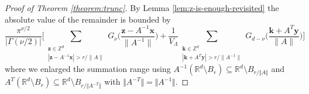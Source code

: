 \documentclass[10pt,a4paper]{amsart}
\begin{document}
\begin{proof}[Proof of Theorem \ref{theorem:trunc}]
By 
Lemma \ref{lem:z-is-enough-revisited} the absolute value of the remainder is bounded by
$$
    \frac{\pi^{\nu/2}}{|\Gamma(\nu/2)|}\Bigg[\sum_{\substack{\bm z\in\mathds Z^d\\ |\bm z - A^{-1}\bm x|> r/\|A\|}}\!\!
    G_{\nu}\Big(\frac{\bm{z} -A^{-1}\bm x}{\|A^{-1}\|}\Big)
+\frac{1}{V_{\Lambda}}
\!\!\!
\sum_{\substack{\bm k\in\mathds Z^d\\ |\bm k + A^T\bm y|> r/\|A^{-1}\|}}
\!\!\!\!\!
G_{d-\nu}
\Big(\frac{\bm{k} + A^T\bm y}{\|A\|}\Big) 
\Bigg]
$$
where we enlarged the summation range using $A^{-1}(\mathds R^d\setminus B_r)\subseteq \mathds R^d\setminus B_{r/\Vert A\Vert}$ and
$A^{T}(\mathds R^d\setminus B_r)\subseteq \mathds R^d\setminus B_{r/\Vert A^{-T}\Vert}$ with $\Vert A^{-T}\Vert=\Vert A^{-1}\Vert$.



\end{proof}
\end{document}

